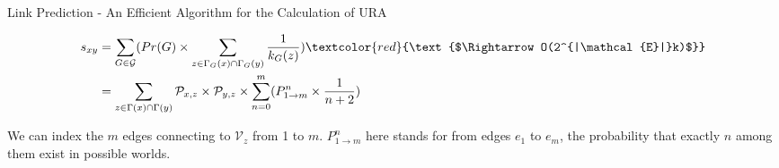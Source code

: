 \documentclass[9pt]{beamer}
\begin{document}












\begin{frame}{Link Prediction - An Efficient Algorithm for the Calculation of URA}

\begin{align*}
s_{xy}&=\sum_{G\in \mathcal{G}}( Pr(G)\times\sum_{z\in \Gamma_G(x)\cap\Gamma_G(y)}\frac{1}{k_G(z)}) \textcolor{red}{\text{$\Rightarrow O(2^{|\mathcal{E}|}k)$}}\\
&=\sum_{z\in \Gamma(x)\cap\Gamma(y)}\mathcal{P}_{x,z}\times\mathcal{P}_{y,z} \times \sum_{n=0}^{m}(P_{1\rightarrow m}^n \times \frac{1}{n+2})
\end{align*}

We can index the $m$ edges connecting to $\mathcal{V}_z$ from 1 to $m$. $P_{1\rightarrow m}^n$ here stands for from edges $e_1$ to $e_m$, the probability that exactly $n$ among them exist in possible worlds.

\end{frame}
\end{document}
